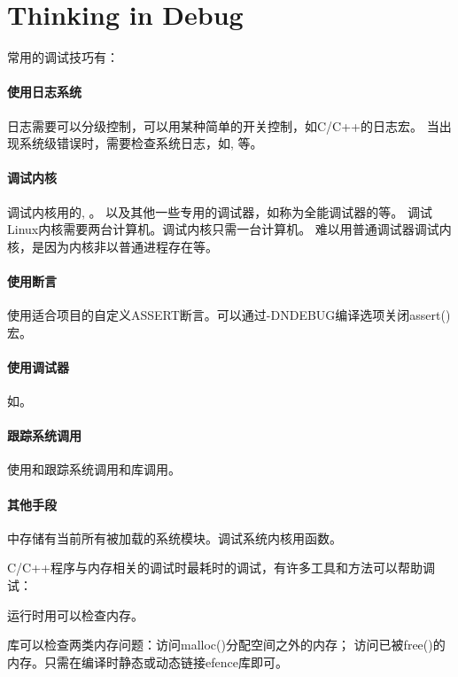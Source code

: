 \section{Thinking in Debug}
常用的调试技巧有：

\paragraph{使用日志系统}
日志需要可以分级控制，可以用某种简单的开关控制，如C/C++的日志宏。
当出现系统级错误时，需要检查系统日志，如, 等。

\paragraph{调试内核}
调试内核用的, 。
以及其他一些专用的调试器，如称为全能调试器的等。
调试Linux内核需要两台计算机。调试内核只需一台计算机。
难以用普通调试器调试内核，是因为内核非以普通进程存在等。

\paragraph{使用断言}
使用适合项目的自定义ASSERT断言。可以通过-DNDEBUG编译选项关闭assert()宏。

\paragraph{使用调试器}
如。

\paragraph{跟踪系统调用}
使用和跟踪系统调用和库调用。

\paragraph{其他手段}
中存储有当前所有被加载的系统模块。调试系统内核用函数。

C/C++程序与内存相关的调试时最耗时的调试，有许多工具和方法可以帮助调试：

运行时用可以检查内存。

库可以检查两类内存问题：访问malloc()分配空间之外的内存；
访问已被free()的内存。只需在编译时静态或动态链接efence库即可。

